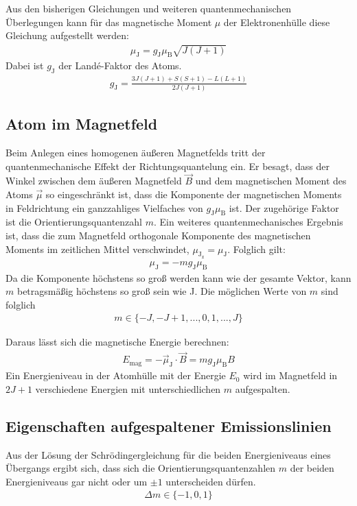 Aus den bisherigen Gleichungen und weiteren quantenmechanischen Überlegungen kann für das magnetische Moment $\mu$ der Elektronenhülle diese Gleichung aufgestellt werden:
\begin{align}
	\mu_\text{J} = g_\text{J} \mu_\text{B} \sqrt{J(J + 1)}
\end{align}
Dabei ist $g_\text{J}$ der Landé-Faktor des Atoms.
\begin{align}
	\label{landefaktor}
	g_\text{J} = \frac{3J(J+1) + S(S + 1) - L(L + 1)}{2 J(J + 1)}
\end{align}

\subsection{Atom im Magnetfeld}
Beim Anlegen eines homogenen äußeren Magnetfelds tritt der quantenmechanische Effekt der Richtungsquantelung ein.
Er besagt, dass der Winkel zwischen dem äußeren Magnetfeld $\vec{B}$ und dem magnetischen Moment des Atoms $\vec{\mu}$ so eingeschränkt ist, dass die Komponente der magnetischen Moments in Feldrichtung ein ganzzahliges Vielfaches von $g_\text{J} \mu_\text{B}$ ist.
Der zugehörige Faktor ist die Orientierungsquantenzahl $m$.
Ein weiteres quantenmechanisches Ergebnis ist, dass die zum Magnetfeld orthogonale Komponente des magnetischen Moments im zeitlichen Mittel verschwindet, $\mu_{\text{J}_\text{z}} = \mu_\text{J}$.
Folglich gilt:
\begin{align}
	\mu_\text{J} = -m g_\text{J} \mu_\text{B}
\end{align}
Da die Komponente höchstens so groß werden kann wie der gesamte Vektor, kann $m$ betragsmäßig höchstens so groß sein wie J.
Die möglichen Werte von $m$ sind folglich
\begin{align}
	m \in \{-J, -J + 1, ..., 0, 1, ..., J\}
\end{align}

Daraus lässt sich die magnetische Energie berechnen:
\begin{align}
	\label{emag}
	E_\text{mag} = - \vec{\mu}_\text{J} \cdot \vec{B} = m g_\text{J} \mu_\text{B} B
\end{align}
Ein Energieniveau in der Atomhülle mit der Energie $E_0$ wird im Magnetfeld in $2J + 1$ verschiedene Energien mit unterschiedlichen $m$ aufgespalten.

\subsection{Eigenschaften aufgespaltener Emissionslinien}
Aus der Lösung der Schrödingergleichung für die beiden Energieniveaus eines Übergangs ergibt sich, dass sich die Orientierungsquantenzahlen $m$ der beiden Energieniveaus gar nicht oder um $\pm1$ unterscheiden dürfen.
\begin{align}
	\Delta m \in \{-1, 0 , 1\}
\end{align}

